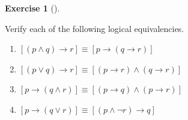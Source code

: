 \documentclass[
  letterpaper,
  10pt,
  reqno,
  twopage,
  openany]{book}
\providecommand{\tightlist}{%
  \setlength{\itemsep}{0pt}\setlength{\parskip}{0pt}}\usepackage{longtable,booktabs,array}
\theoremstyle{plain}
\theoremstyle{definition}
\newtheorem{exercise}{Exercise}[chapter]
\theoremstyle{definition}
\theoremstyle{definition}
\theoremstyle{plain}
\theoremstyle{plain}
\theoremstyle{remark}
\begin{document}
\leavevmode{}%
\begin{exercise}[]\label{exr-verify-logical-equivalencies}

Verify each of the following logical equivalencies.

\begin{enumerate}
\def\labelenumi{\arabic{enumi}.}
\tightlist
\item
  \([(p\land q)\rightarrow r]\equiv [p\rightarrow (q\rightarrow r)]\)
\item
  \([(p\lor q)\rightarrow r]\equiv[(p\rightarrow r)\land (q\rightarrow r)]\)
\item
  \([p\rightarrow (q\land r)]\equiv[(p \rightarrow q)\land (p\rightarrow r)]\)
\item
  \([p\rightarrow (q\lor r)]\equiv[(p\land \neg r)\rightarrow q]\)
\end{enumerate}

\end{exercise}
\end{document}
